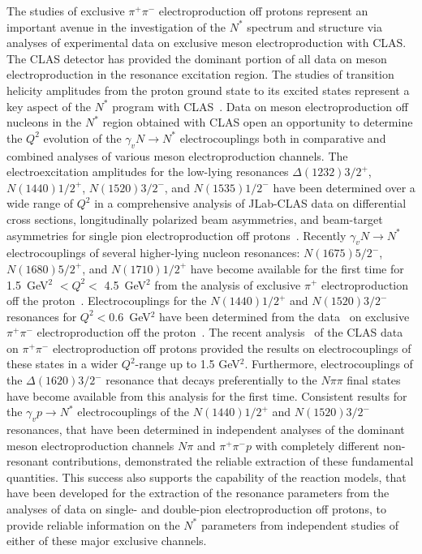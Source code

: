 The studies of exclusive $\pi^+ \pi^- $ electroproduction off protons represent an important avenue in the investigation of the
$N^*$ spectrum and structure via analyses of experimental data on exclusive meson electroproduction with CLAS. The CLAS detector has provided the 
dominant portion of all data on meson electroproduction in the resonance excitation region. The studies of 
transition helicity amplitudes from the proton ground state to its excited states represent a key aspect of
the $N^*$ program with CLAS~\cite{Aznauryan:2011qj,Aznauryan:2011ub}. Data on meson electroproduction off nucleons in the $N^*$ region obtained with CLAS open an opportunity to 
determine the $Q^2$ evolution of the $\gamma_vN \rightarrow N^*$ electrocouplings both in comparative and combined analyses of various meson electroproduction channels. The electroexcitation amplitudes for the low-lying resonances $\Delta(1232)3/2^+$, $N(1440)1/2^+$, $N(1520)3/2^-$,
and $N(1535)1/2^-$ have been determined over a wide range of $Q^2$ in a comprehensive analysis of JLab-CLAS data 
on differential cross sections, longitudinally polarized beam asymmetries, and 
beam-target asymmetries for single pion electroproduction off protons~\cite{Aznauryan:2009mx}. Recently $\gamma_v N \rightarrow N^*$ electrocouplings of several higher-lying nucleon 
resonances: $N(1675)5/2^-$, $N(1680)5/2^+$, and $N(1710)1/2^+$ have become available for the first time for 
1.5~GeV$^2$ $< Q^2 <$ 4.5~GeV$^2$ from the analysis of exclusive $\pi^+$ electroproduction off the proton~\cite{Park:2014yea}. 
Electrocouplings for the $N(1440)1/2^+$ and $N(1520)3/2^-$ resonances for $Q^2 < 0.6$~GeV$^2$ have been 
determined from the data~\cite{Fedotov:2008aa} on exclusive $\pi^+\pi^-$ electroproduction off the proton~\cite{Mokeev:2012vsa}. The recent analysis~\cite{Mokeev:2015lda}
of the CLAS data on $\pi^+ \pi^- $ electroproduction off protons \cite{Ripani:2002ss} provided the results on electrocouplings of these states in a wider $Q^2$-range up to 1.5 GeV$^2$. Furthermore, electrocouplings of the $\Delta(1620)3/2^-$ resonance that decays preferentially to the $N\pi\pi$ final states have become available from this analysis for the first time.
Consistent results for the $\gamma_vp \rightarrow N^*$ electrocouplings of the $N(1440)1/2^+$ and  $N(1520)3/2^-$ resonances, that have been determined in independent analyses of the dominant meson electroproduction channels $N\pi$ and $\pi^+\pi^-p$ with completely different non-resonant contributions,  demonstrated the reliable extraction of these fundamental quantities. This success also supports the capability of the reaction models, that have been developed for the extraction of the resonance parameters from the analyses of data on single- \cite{Aznauryan:2009mx} and double-pion \cite{Mokeev:2008iw} electroproduction off protons, to provide reliable information on the $N^*$ parameters from independent studies of either of these major exclusive channels.





